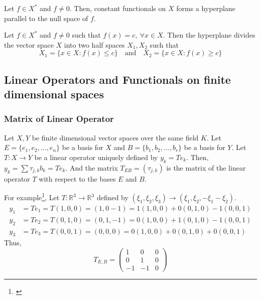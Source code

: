 \begin{remark}
	Let $f \in X^\ast$ and $f \ne 0$.
	Then, constant functionals on $X$ forms a hyperplane parallel to the null space of $f$.
\end{remark}

\begin{definition}
	Let $f \in X^\ast$ and $f \ne 0$ such that $f(x) = c,\ \forall x \in X$.
	Then the hyperplane divides the vector space $X$ into two half spaces $X_1,X_2$ such that
	\[ X_1 = \{ x \in X : f(x) \le c \} \quad \text{and} \quad X_2 = \{ x \in X : f(x) \ge c \} \]
\end{definition}


\subsection{Linear Operators and Functionals on finite dimensional spaces}
\subsubsection{Matrix of Linear Operator}
Let $X,Y$ be finite dimensional vector spaces over the same field $K$.
Let $E = \{e_1,e_2,\dots,e_n\}$ be a basis for $X$ and $B = \{b_1,b_2,\dots,b_r\}$ be a basis for $Y$.
Let $T : X \to Y$ be a linear operator uniquely defined by $y_k = Te_k$.
Then, $y_k = \sum \tau_{j,k}b_k = Te_k$.
And the matrix $T_{EB} = (\tau_{j,k})$ is the matrix of the linear operator $T$ with respect to the bases $E$ and $B$.\\

\begin{commentary}
	For example\footnote{\cite[\S2.10 Exercise 2]{kreyszig}},
	Let $T :\mathbb{R}^3 \to \mathbb{R}^3$ defined by $(\xi_1,\xi_2,\xi_3) \to (\xi_1,\xi_2,-\xi_1-\xi_2)$.
	\begin{align*}
		y_1 &= Te_1 = T(1,0,0) = (1,0-1) = 1(1,0,0)+0(0,1,0)-1(0,0,1) \\
		y_2 &= Te_2 = T(0,1,0) = (0,1,-1) = 0(1,0,0)+1(0,1,0)-1(0,0,1) \\
		y_3 &= Te_3 = T(0,0,1) = (0,0,0) = 0(1,0,0)+0(0,1,0)+0(0,0,1)
	\end{align*}
	Thus,
	\[ T_{E,B} = \begin{pmatrix} 1 & 0 & 0\\ 0 & 1 & 0 \\ -1 & -1 & 0 \end{pmatrix} \]
\end{commentary}

